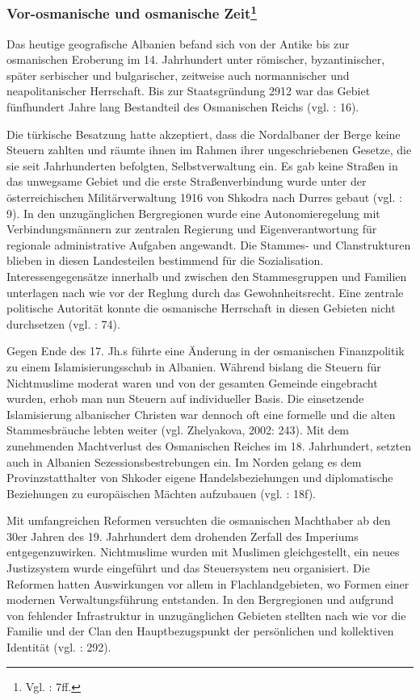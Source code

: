 \subsubsection[Vor-osmanische und osmanische Zeit]{Vor-osmanische und osmanische Zeit\footnote{Vgl. \cite{vollmer07}: 7ff.}}
Das heutige geografische Albanien befand sich von der Antike bis zur osmanischen Eroberung im 14. Jahrhundert unter römischer, byzantinischer, später serbischer und bulgarischer, zeitweise auch normannischer und neapolitanischer Herrschaft. Bis zur Staatsgründung 2912 war das Gebiet fünfhundert Jahre lang Bestandteil des Osmanischen Reichs (vgl. \cite{winnifrith}: 16).\par
Die türkische Besatzung hatte akzeptiert, dass die Nordalbaner der Berge keine Steuern zahlten und räumte ihnen im Rahmen ihrer ungeschriebenen Gesetze, die sie seit Jahrhunderten befolgten, Selbstverwaltung ein. Es gab keine Straßen in das unwegsame Gebiet und die erste Straßenverbindung wurde unter der österreichischen Militärverwaltung 1916 von Shkodra nach Durres gebaut (vgl. \cite{hasluk}: 9). In den unzugänglichen Bergregionen wurde eine Autonomieregelung mit Verbindungsmännern zur zentralen Regierung und Eigenverantwortung für regionale administrative Aufgaben angewandt. Die Stammes- und Clanstrukturen blieben in diesen Landesteilen bestimmend für die Sozialisation. Interessengegensätze innerhalb und zwischen den Stammesgruppen und Familien unterlagen nach wie vor der Reglung durch das Gewohnheitsrecht. Eine zentrale politische Autorität konnte die osmanische Herrschaft in diesen Gebieten nicht durchsetzen (vgl. \cite{hens99}: 74).\par
Gegen Ende des 17. Jh.s führte eine Änderung in der osmanischen Finanzpolitik zu einem Islamisierungsschub in Albanien. Während bislang die Steuern für Nichtmuslime moderat waren und von der gesamten Gemeinde eingebracht wurden, erhob man nun Steuern auf individueller Basis. Die einsetzende Islamisierung albanischer Christen war dennoch oft eine formelle und die alten Stammesbräuche lebten weiter (vgl. Zhelyakova, 2002: 243). Mit dem zunehmenden Machtverlust des Osmanischen Reiches im 18. Jahrhundert, setzten auch in Albanien Sezessionsbestrebungen ein. Im Norden gelang es dem Provinzstatthalter von Shkoder eigene Handelsbeziehungen und diplomatische Beziehungen zu europäischen Mächten aufzubauen (vgl. \cite{vickers}: 18f).\par
Mit umfangreichen Reformen versuchten die osmanischen Machthaber ab den 30er Jahren des 19. Jahrhundert dem drohenden Zerfall des Imperiums entgegenzuwirken. Nichtmuslime wurden mit Muslimen gleichgestellt, ein neues Justizsystem wurde eingeführt und das Steuersystem neu organisiert. Die Reformen hatten Auswirkungen vor allem in Flachlandgebieten, wo Formen einer modernen Verwaltungsführung entstanden. In den Bergregionen und aufgrund von fehlender Infrastruktur in unzugänglichen Gebieten stellten nach wie vor die Familie und der Clan den Hauptbezugspunkt der persönlichen und kollektiven Identität (vgl. \cite{kaser}: 292).\par
